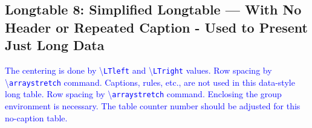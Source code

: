 \documentclass[phd,showframe]{ndsu-thesis-2022}
\newcommand\italk[1]{\textcolor{blue}{#1}}  %
\newcommand\cmd[1]{\textbackslash\texttt{#1}}  %
\begin{document}
\subsection{Longtable 8: Simplified Longtable --- With No Header or Repeated Caption - Used to Present Just Long Data}

\italk{The centering is done by \cmd{LTleft} and \cmd{LTright} values. Row spacing by \cmd{arraystretch} command. Captions, rules, etc., are not used in this data-style long table. Row spacing by \cmd{arraystretch} command. Enclosing the group environment is necessary. The table counter number should be adjusted for this no-caption table.}

\begingroup
\setlength{\LTleft}{0.5cm plus -1fill}%
\setlength{\LTright}{\LTleft}%
\renewcommand{\arraystretch}{0.6}%
\end{document}
